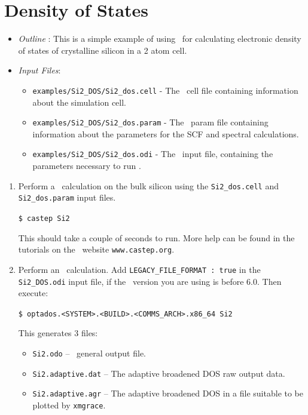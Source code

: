\documentclass[a4paper,11pt,twoside]{book}
\begin{document}
{\section{Density of States}
\begin{itemize}
\item \emph{Outline} : This is a simple example of using \optados\ for calculating electronic density of states of crystalline silicon in a 2 atom cell.
\item \emph{Input Files}:
\begin{itemize}
\item \verb#examples/Si2_DOS/Si2_dos.cell# - The \castep\ cell file containing information about the simulation cell.
\item \verb#examples/Si2_DOS/Si2_dos.param# - The \castep\ param file containing information about the parameters for the SCF and spectral calculations.
\item \verb#examples/Si2_DOS/Si2_dos.odi# - The \optados\ input file, containing the parameters necessary to run \optados.
\end{itemize}
\end{itemize}

\begin{enumerate}
\item Perform a \castep\ calculation on the bulk silicon using the  \verb#Si2_dos.cell#  and \verb#Si2_dos.param# input files.

  \verb#$ castep Si2#

This should take a couple of seconds to run. More help can be found in  the tutorials  on  the \castep\ website \verb#www.castep.org#.

\item Perform an \optados\ calculation.  Add \verb#LEGACY_FILE_FORMAT : true# in the \verb#Si2_DOS.odi# input file, if the \castep\ version you are using is before 6.0. Then execute:

\verb#$ optados.<SYSTEM>.<BUILD>.<COMMS_ARCH>.x86_64 Si2#

This generates 3 files:
\begin{itemize}
\item \verb#Si2.odo# -- \optados\ general output file.
\item \verb#Si2.adaptive.dat# -- The adaptive broadened DOS raw output data.
\item  \verb#Si2.adaptive.agr# -- The adaptive broadened DOS in a file suitable to be plotted by  \verb#xmgrace#.
\end{itemize}


\end{enumerate}}
\end{document}
